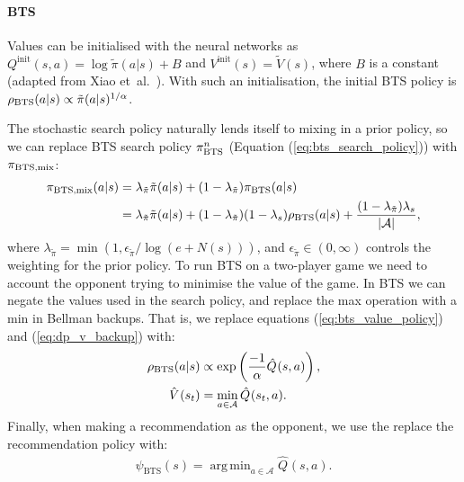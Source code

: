 \documentclass{article}
\newcommand{\etal}{et~al.\ }
\newcommand{\cl}[1]{\mathcal{#1}}
\newcommand{\Vt}[2]{\hat{V}^{#2}(#1)}
\newcommand{\Qt}[3]{\hat{Q}^{#3}(#1,#2)}
\DeclareMathOperator*{\argmin}{arg\,min}
\theoremstyle{plain}
\begin{document}
\begin{appendices}
            \paragraph{BTS}
            Values can be initialised with the neural networks as $Q^{\text{init}}(s,a)=\log \tilde{\pi}(a|s)+B$ and $V^{\text{init}}(s)=\tilde{V}(s)$, where $B$ is a constant (adapted from Xiao \etal \cite{xiao2019maximum}). With such an initialisation, the initial BTS policy is $\rho_{\textnormal{BTS}}(a|s)\propto\tilde{\pi}(a|s)^{1/\alpha}$.
            
            The stochastic search policy naturally lends itself to mixing in a prior policy, so we can replace BTS search policy $\pi_{\textnormal{BTS}}^{n}$ (Equation (\ref{eq:bts_search_policy})) with $\pi_{\textnormal{BTS,mix}}$:
            \begin{align}
                \pi_{\textnormal{BTS,mix}}(a|s) 
                &= \lambda_{\tilde{\pi}}\tilde{\pi}(a|s) + (1-\lambda_{\tilde{\pi}}) \pi_{\textnormal{BTS}}(a|s) \\
                &= \lambda_{\tilde{\pi}}\tilde{\pi}(a|s) + (1-\lambda_{\tilde{\pi}})(1-\lambda_s)\rho_{\textnormal{BTS}}(a|s) + \frac{(1-\lambda_{\tilde{\pi}})\lambda_s}{|\cl{A}|}, \label{appeq:ments_mixed_policy}
            \end{align}
            where $\lambda_{\tilde{\pi}}=\min(1,\epsilon_{\tilde{\pi}}/\log(e+N(s)))$, and $\epsilon_{\tilde{\pi}} \in (0,\infty)$ controls the weighting for the prior policy. To run BTS on a two-player game we need to account the opponent trying to minimise the value of the game. In BTS we can negate the values used in the search policy, and replace the max operation with a min in Bellman backups. That is, we replace equations (\ref{eq:bts_value_policy}) and (\ref{eq:dp_v_backup}) with:
            \begin{align}
                \rho_{\textnormal{BTS}}(a|s) &\propto \exp\left(\frac{-1}{\alpha}\Qt{s}{a}{}\right), \\
                \Vt{s_t}{} &=\min_{a\in\cl{A}} \Qt{s_t}{a}{}. \label{appeq:bellman_v_oponent}
            \end{align}
            Finally, when making a recommendation as the opponent, we use the replace the recommendation policy with:
            \begin{align}
                \psi_{\text{BTS}}(s)=\argmin_{a\in\cl{A}}\Qt{s}{a}{}.
            \end{align}
            


\end{appendices}
\end{document}
